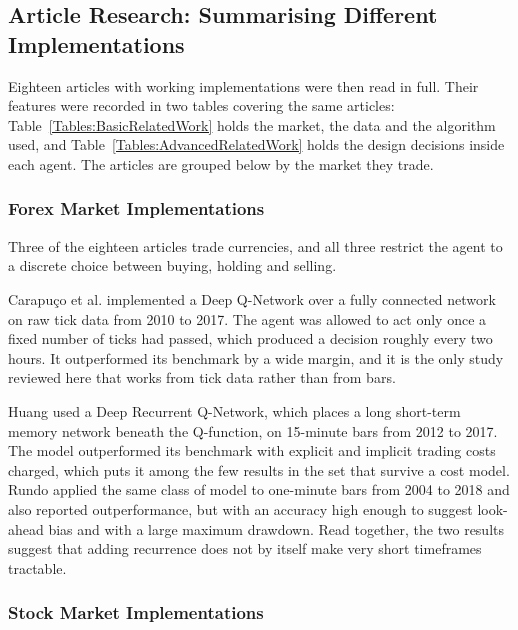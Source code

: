 \subsection{Article Research: Summarising Different Implementations}

Eighteen articles with working implementations were then read in full. Their features were recorded in two tables covering the same articles: Table~\ref{Tables:BasicRelatedWork} holds the market, the data and the algorithm used, and Table~\ref{Tables:AdvancedRelatedWork} holds the design decisions inside each agent. The articles are grouped below by the market they trade.




\subsubsection{Forex Market Implementations}

Three of the eighteen articles trade currencies, and all three restrict the agent to a discrete choice between buying, holding and selling.

Carapuço et al. \cite{carapuco_reinforcement_2018} implemented a Deep Q-Network over a fully connected network on raw tick data from 2010 to 2017. The agent was allowed to act only once a fixed number of ticks had passed, which produced a decision roughly every two hours. It outperformed its benchmark by a wide margin, and it is the only study reviewed here that works from tick data rather than from bars.

Huang \cite{huang_financial_2018} used a Deep Recurrent Q-Network, which places a long short-term memory network beneath the Q-function, on 15-minute bars from 2012 to 2017. The model outperformed its benchmark with explicit and implicit trading costs charged, which puts it among the few results in the set that survive a cost model. Rundo \cite{rundo_deep_2019} applied the same class of model to one-minute bars from 2004 to 2018 and also reported outperformance, but with an accuracy high enough to suggest look-ahead bias and with a large maximum drawdown. Read together, the two results suggest that adding recurrence does not by itself make very short timeframes tractable.

\subsubsection{Stock Market Implementations}

